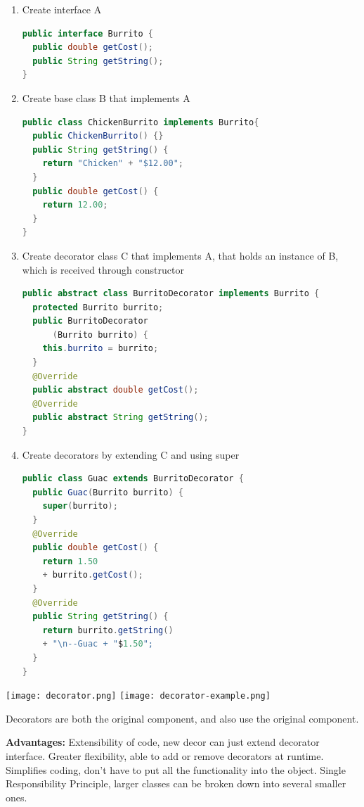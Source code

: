 \documentclass[letterpaper, 8pt]{extarticle}
\begin{document}
\begin{multicols*}{6}
  \begin{enumerate}
    \item Create interface A
          \begin{lstlisting}[language=Java, breaklines=true]
public interface Burrito {
  public double getCost();
  public String getString();
}
        \end{lstlisting}
    \item Create base class B that implements A
          \begin{lstlisting}[language=Java, breaklines=true]
public class ChickenBurrito implements Burrito{
  public ChickenBurrito() {}
  public String getString() {
	return "Chicken" + "$12.00";
  }
  public double getCost() {
    return 12.00;
  }
}
        \end{lstlisting}
    \item Create decorator class C that implements A,
          that holds an instance of B,
          which is received through constructor
          \begin{lstlisting}[language=Java, breaklines=true]
public abstract class BurritoDecorator implements Burrito {
  protected Burrito burrito;
  public BurritoDecorator
      (Burrito burrito) {
    this.burrito = burrito;
  }
  @Override
  public abstract double getCost();
  @Override
  public abstract String getString();
}
        \end{lstlisting}
    \item Create decorators by extending C and using super
          \begin{lstlisting}[language=Java, breaklines=true]
public class Guac extends BurritoDecorator {
  public Guac(Burrito burrito) {
	super(burrito);
  }
  @Override
  public double getCost() {
	return 1.50
    + burrito.getCost();
  }
  @Override
  public String getString() {
	return burrito.getString() 
    + "\n--Guac + "$1.50";
  }
}\end{lstlisting}
  \end{enumerate}

  \begin{center}
    \texttt{[image: decorator.png]}
    \texttt{[image: decorator-example.png]}
  \end{center}

  Decorators are both the original component, and also use the original component.

  \textbf{Advantages:}
  Extensibility of code, new decor can just extend decorator interface.
  Greater flexibility, able to add or remove decorators at runtime.
  Simplifies coding, don't have to put all the functionality into the object.
  Single Responsibility Principle, larger classes can be broken down into several smaller ones.


\end{multicols*}
\end{document}
